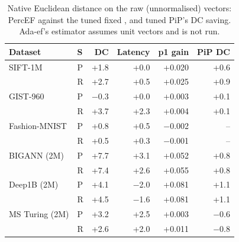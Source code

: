 \begin{table}[t]
  \caption{Native Euclidean distance on the raw (unnormalised) vectors: PercEF against the tuned fixed \ef{}, and tuned PiP's DC saving. Ada-ef's estimator assumes unit vectors and is not run.}
  \label{tab:vj-l2}
  \centering\footnotesize\setlength{\tabcolsep}{3.5pt}
  \begin{tabular}{llrrrr}
    \toprule
    Dataset & S & DC & Latency & p1 gain & PiP DC \\
    \midrule
    SIFT-1M & P & +1.8 & +0.0 & +0.020 & +0.6 \\
     & R & +2.7 & +0.5 & +0.025 & +0.9 \\
    GIST-960 & P & $-$0.3 & +0.0 & +0.003 & +0.1 \\
     & R & +3.7 & +2.3 & +0.004 & +0.1 \\
    Fashion-MNIST & P & +0.8 & +0.5 & $-$0.002 & -- \\
     & R & +0.5 & +0.3 & $-$0.001 & -- \\
    BIGANN (2M) & P & +7.7 & +3.1 & +0.052 & +0.8 \\
     & R & +7.4 & +2.6 & +0.055 & +0.8 \\
    Deep1B (2M) & P & +4.1 & $-$2.0 & +0.081 & +1.1 \\
     & R & +4.5 & $-$1.6 & +0.081 & +1.1 \\
    MS Turing (2M) & P & +3.2 & +2.5 & +0.003 & $-$0.6 \\
     & R & +2.6 & +2.0 & +0.011 & $-$0.8 \\
    \bottomrule
  \end{tabular}
\end{table}
